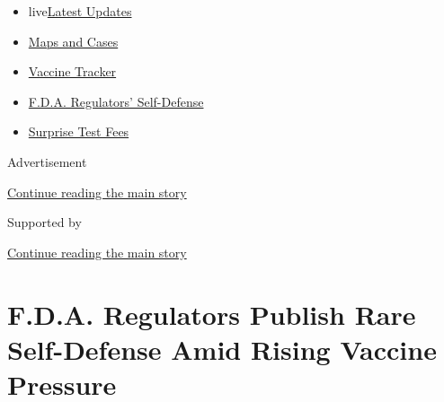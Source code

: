 \begin{itemize}
\tightlist
\item
  live\href{https://www.nytimes3xbfgragh.onion/2020/09/12/world/covid-19-coronavirus.html?name=styln-coronavirus-national\&region=TOP_BANNER\&block=storyline_menu_recirc\&action=click\&pgtype=Article\&impression_id=8ae4c291-f52e-11ea-a27c-57a91b2bcc92\&variant=undefined}{Latest
  Updates}
\item
  \href{https://www.nytimes3xbfgragh.onion/interactive/2020/us/coronavirus-us-cases.html?name=styln-coronavirus-national\&region=TOP_BANNER\&block=storyline_menu_recirc\&action=click\&pgtype=Article\&impression_id=8ae4e9a0-f52e-11ea-a27c-57a91b2bcc92\&variant=undefined}{Maps
  and Cases}
\item
  \href{https://www.nytimes3xbfgragh.onion/interactive/2020/science/coronavirus-vaccine-tracker.html?name=styln-coronavirus-national\&region=TOP_BANNER\&block=storyline_menu_recirc\&action=click\&pgtype=Article\&impression_id=8ae4e9a1-f52e-11ea-a27c-57a91b2bcc92\&variant=undefined}{Vaccine
  Tracker}
\item
  \href{https://www.nytimes3xbfgragh.onion/2020/09/10/us/politics/fda-coronavirus-vaccine.html?name=styln-coronavirus-national\&region=TOP_BANNER\&block=storyline_menu_recirc\&action=click\&pgtype=Article\&impression_id=8ae4e9a2-f52e-11ea-a27c-57a91b2bcc92\&variant=undefined}{F.D.A.
  Regulators' Self-Defense}
\item
  \href{https://www.nytimes3xbfgragh.onion/2020/09/09/upshot/coronavirus-surprise-test-fees.html?name=styln-coronavirus-national\&region=TOP_BANNER\&block=storyline_menu_recirc\&action=click\&pgtype=Article\&impression_id=8ae4e9a3-f52e-11ea-a27c-57a91b2bcc92\&variant=undefined}{Surprise
  Test Fees}
\end{itemize}

Advertisement

\protect\hyperlink{after-top}{Continue reading the main story}

Supported by

\protect\hyperlink{after-sponsor}{Continue reading the main story}

\hypertarget{fda-regulators-publish-rare-self-defense-amid-rising-vaccine-pressure}{%
\section{F.D.A. Regulators Publish Rare Self-Defense Amid Rising Vaccine
Pressure}\label{fda-regulators-publish-rare-self-defense-amid-rising-vaccine-pressure}}

